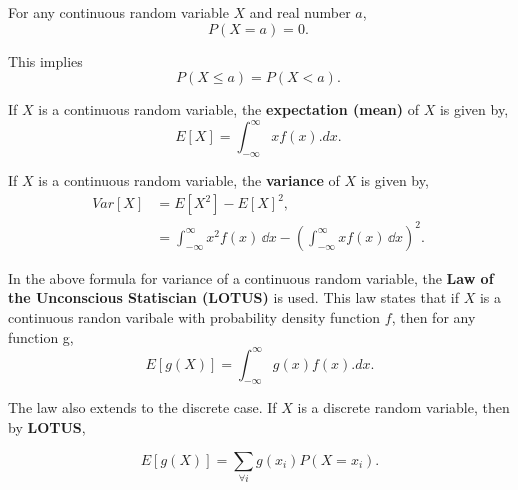 \begin{prop} \label{mod2:prop:ContinuousRV:2}
	For any continuous random variable $X$ and real number $a$,
	\begin{equation}
	P(X=a) = 0.\
	\end{equation}
\end{prop}

\begin{note} 
	This implies
	\begin{equation}
	P( X \leq a) = P(X<a). \
	\end{equation}
\end{note}

\begin{defn} \label{mod2:defn:ContinuousRV:Expectation}
	If $X$ is a continuous random variable, the \textbf{expectation (mean)} of $X$ is given by,
	\begin{equation}
	E[X] = \int_{-\infty}^{\infty}x f(x).dx. \label{mod2:eq:ContinuousRV:Expectation} \
	\end{equation}
\end{defn}

\begin{defn} \label{mod2:defn:ContinuousRV:Variance}
	If $X$ is a continuous random variable, the \textbf{variance} of $X$ is given by,
	\begin{align}
	Var[X] &= E[X^2] - {E[X]}^2, \\
	 &= \int_{-\infty}^{\infty}x^2 f(x)\,\dd x - {\left(\int_{-\infty}^{\infty}x f(x)\,\dd x \right)} ^ 2. \label{mod2:eq:ContinuousRV:Variance} \
	\end{align}
\end{defn}

\begin{law} \label{mod2:law:UnconsciousStat}
	In the above formula for variance of a continuous random variable,  the \textbf{Law of the Unconscious Statiscian (LOTUS)} is used. This law states that if $X$ is a continuous randon varibale with probability density function $f$, then for any function g,
	\begin{equation}
		E[g(X)] = \int_{-\infty}^{\infty}g(x) f(x).dx. \label{mod2:eq:LOTUS:ContinuousRV}
	\end{equation}
	
	The law also extends to the discrete case. If $X$ is a discrete random variable, then by \textbf{LOTUS}, 
	
	\begin{equation}
	E[g(X)] =  \sum_{\forall i} g(x_i) P(X=x_i). \label{mod2:eq:LOTUS:DiscreteRV}
	\end{equation}
\end{law}	


